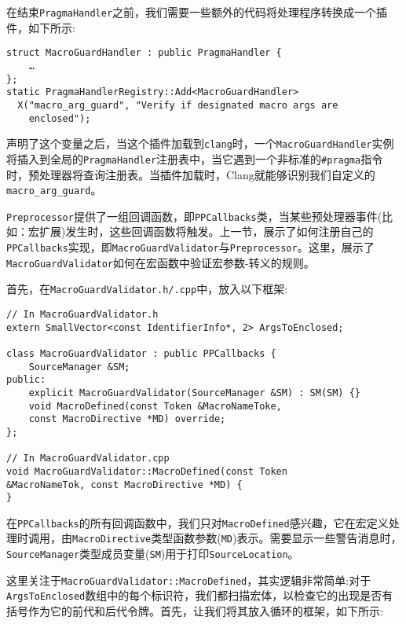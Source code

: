 在结束\texttt{PragmaHandler}之前，我们需要一些额外的代码将处理程序转换成一个插件，如下所示:

\begin{lstlisting}[style=styleCXX]
struct MacroGuardHandler : public PragmaHandler {
	…
};
static PragmaHandlerRegistry::Add<MacroGuardHandler>
  X("macro_arg_guard", "Verify if designated macro args are
    enclosed");
\end{lstlisting}

声明了这个变量之后，当这个插件加载到\texttt{clang}时，一个\texttt{MacroGuardHandler}实例将插入到全局的\texttt{PragmaHandler}注册表中，当它遇到一个非标准的\texttt{\#pragma}指令时，预处理器将查询注册表。当插件加载时，Clang就能够识别我们自定义的\texttt{macro\_arg\_guard}。


\texttt{Preprocessor}提供了一组回调函数，即\texttt{PPCallbacks}类，当某些预处理器事件(比如：宏扩展)发生时，这些回调函数将触发。上一节，展示了如何注册自己的\texttt{PPCallbacks}实现，即\texttt{MacroGuardValidator}与\texttt{Preprocessor}。这里，展示了\texttt{MacroGuardValidator}如何在宏函数中验证宏参数-转义的规则。

首先，在\texttt{MacroGuardValidator.h/.cpp}中，放入以下框架:

\begin{lstlisting}[style=styleCXX]
// In MacroGuardValidator.h
extern SmallVector<const IdentifierInfo*, 2> ArgsToEnclosed;

class MacroGuardValidator : public PPCallbacks {
	SourceManager &SM;
public:
	explicit MacroGuardValidator(SourceManager &SM) : SM(SM) {}
	void MacroDefined(const Token &MacroNameToke,
	const MacroDirective *MD) override;
};

// In MacroGuardValidator.cpp
void MacroGuardValidator::MacroDefined(const Token
&MacroNameTok, const MacroDirective *MD) {
}
\end{lstlisting}

在\texttt{PPCallbacks}的所有回调函数中，我们只对\texttt{MacroDefined}感兴趣，它在宏定义处理时调用，由\texttt{MacroDirective}类型函数参数(\texttt{MD})表示。需要显示一些警告消息时，\texttt{SourceManager}类型成员变量(\texttt{SM})用于打印\texttt{SourceLocation}。

这里关注于\texttt{MacroGuardValidator::MacroDefined}，其实逻辑非常简单:对于\texttt{ArgsToEnclosed}数组中的每个标识符，我们都扫描宏体，以检查它的出现是否有括号作为它的前代和后代令牌。首先，让我们将其放入循环的框架，如下所示:


